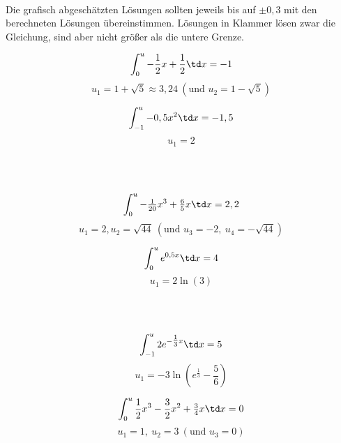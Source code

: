 \begin{Answer}[ref=intGrenzeA1]\\
	Die grafisch abgeschätzten Lösungen sollten jeweils bis auf \(\pm0,3\) mit den berechneten Lösungen übereinstimmen. Lösungen in Klammer lösen zwar die Gleichung, sind aber nicht größer als die untere Grenze.\\
	\begin{minipage}{\textwidth}
		\begin{minipage}{.5\textwidth}\raggedright
			\[\int_0^u-\frac{1}{2}x+\frac{1}{2} \td x=-1\]
			\[u_1=1+\sqrt{5}\approx3,24\ \left(\text{und }u_2=1-\sqrt{5}\right)\] 
		\end{minipage}
		\begin{minipage}{.5\textwidth}
			\[\int_{-1}^u-0,5x^2 \td x=-1,5\]
			\[u_1=2\]
		\end{minipage}\vspace{\baselineskip}\\\vspace{\baselineskip}\\
		\begin{minipage}{.5\textwidth}\raggedright
			\[\int_0^u-\tfrac{1}{20}x^3+\tfrac{6}{5}x \td x=2,2\]
			\[u_1=2, u_2=\sqrt{44}\ \left(\text{und }u_3=-2,\ u_4=-\sqrt{44}\right)\]
		\end{minipage}
		\begin{minipage}{.5\textwidth}
			\[\int_0^u e^{0,5x} \td x=4\]
			\[u_1=2\ln(3)\]
		\end{minipage}\vspace{\baselineskip}\\\vspace{\baselineskip}\\
		\begin{minipage}{.5\textwidth}\raggedright
			\[\int_{-1}^u 2e^{-\tfrac{1}{3}x} \td x=5\]
			\[u_1=-3\ln\left(e^{\tfrac{1}{3}}-\frac{5}{6}\right)\]
		\end{minipage}
		\begin{minipage}{.5\textwidth}
			\[\int_0^u \frac{1}{2}x^3-\frac{3}{2}x^2+\tfrac{3}{4}x \td x=0\]
			\[u_1=1,\ u_2=3\ \left(\text{und }u_3=0\right)\] 
		\end{minipage}
	\end{minipage}
\end{Answer}